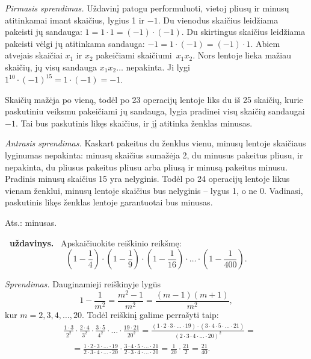 \documentclass[11pt,a4paper]{article}
\newcounter{uzdavinys}
\newenvironment{uzdavinys}
  {\refstepcounter{uzdavinys}\par\medskip\noindent\textbf{\theuzdavinys\ uždavinys.}\ }
  {\par\medskip}
\begin{document}
\textit{Pirmasis sprendimas.} Uždavinį patogu performuluoti, vietoj pliusų ir minusų atitinkamai imant skaičius, lygius 1 ir $-1$. Du vienodus skaičius leidžiama pakeisti jų sandauga: $1=1\cdot1=(-1)\cdot(-1)$. Du skirtingus skaičius leidžiama pakeisti vėlgi jų atitinkama sandauga: $-1=1\cdot(-1)=(-1)\cdot1$. Abiem atvejais skaičiai $x_1$ ir $x_2$ pakeičiami skaičiumi~$x_1x_2$. Nors lentoje lieka mažiau skaičių, jų visų sandauga $x_1x_2\ldots$ nepakinta. Ji lygi $1^{10}\cdot(-1)^{15}=1\cdot(-1)=-1$.

Skaičių mažėja po vieną, todėl po 23 operacijų lentoje liks du iš 25 skaičių, kurie paskutiniu veiksmu pakeičiami jų sandauga, lygia pradinei visų skaičių sandaugai $-1$. Tai bus paskutinis likęs skaičius, ir jį atitinka ženklas minusas. 

\vspace{0,3cm}

\textit{Antrasis sprendimas.} Kaskart pakeitus du ženklus vienu, minusų lentoje skaičiaus lyginumas nepakinta: minusų skaičius sumažėja 2, du minusus pakeitus pliusu, ir nepakinta, du pliusus pakeitus pliusu arba pliusą ir minusą pakeitus minusu. Pradinis minusų skaičius 15 yra nelyginis. Todėl po 24 operacijų lentoje likus vienam ženklui, minusų lentoje skaičius bus nelyginis -- lygus 1, o ne 0. Vadinasi, paskutinis likęs ženklas lentoje garantuotai bus minusas.

\begin{flushright}
Ats.: minusas.
\end{flushright}
 \vspace{0,3cm} 

\begin{uzdavinys} 
Apskaičiuokite reiškinio reikšmę:
$$\left(1-\frac{1}{4}\right)\cdot\left(1-\frac{1}{9}\right)\cdot\left(1-\frac{1}{16}\right)\cdot\ldots\cdot\left(1-\frac{1}{400}\right).$$
\end{uzdavinys}

\textit{Sprendimas.} Dauginamieji reiškinyje lygūs
$$1-\frac{1}{m^2}=\frac{m^2-1}{m^2}=\frac{(m-1)(m+1)}{m^2},$$
kur $m=2, 3, 4, \ldots, 20$. Todėl reiškinį galime perrašyti taip:
\begin{align*}&\frac{1\cdot3}{2^2}\cdot\frac{2\cdot4}{3^2}\cdot\frac{3\cdot5}{4^2}\cdot\ldots\cdot\frac{19\cdot21}{20^2}=\frac{(1\cdot2\cdot3\cdot\ldots\cdot19)\cdot
(3\cdot4\cdot5\cdot\ldots\cdot21)}{(2\cdot3\cdot4\cdot\ldots\cdot20)^2}=\\&\quad=
\frac{1\cdot2\cdot3\cdot\ldots\cdot19}{2\cdot3\cdot4\cdot\ldots\cdot20}\cdot\frac{3\cdot4\cdot5\cdot\ldots\cdot21}{2\cdot3\cdot4\cdot\ldots\cdot20}=\frac{1}{20}\cdot\frac{21}{2}=\frac{21}{40}.\end{align*}
\end{document}
